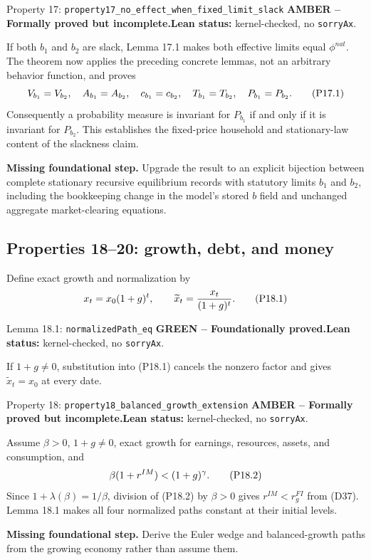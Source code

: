 \documentclass[11pt]{article}
\newcommand{\leanname}[1]{\nolinkurl{#1}}
\newcommand{\eqP}[1]{\refstepcounter{equation}\tag{P#1}}
\newcommand{\formalcheck}{\textbf{Lean status:} kernel-checked, no \texttt{sorryAx}.}
\newcommand{\missing}[1]{\par\smallskip\textbf{Missing foundational step.} #1}
\newcommand{\greenstatus}{\textcolor{proved}{\textbf{GREEN -- Foundationally proved.}}}
\newcommand{\amberstatus}{\textcolor{conditional}{\textbf{AMBER -- Formally proved but incomplete.}}}
\begin{document}
\begin{amberbox}{Property 17: \leanname{property17_no_effect_when_fixed_limit_slack}}
\amberstatus\quad\formalcheck

If both \(b_1\) and \(b_2\) are slack, Lemma 17.1 makes both effective limits
equal \(\phi^{nat}\).  The theorem now applies the preceding concrete lemmas,
not an arbitrary behavior function, and proves
\begin{equation}
 V_{b_1}=V_{b_2},\quad A_{b_1}=A_{b_2},\quad c_{b_1}=c_{b_2},\quad
 T_{b_1}=T_{b_2},\quad P_{b_1}=P_{b_2}. \eqP{17.1}\label{P17.1}
\end{equation}
Consequently a probability measure is invariant for $P_{b_1}$ if and only if
it is invariant for $P_{b_2}$.  This establishes the fixed-price household
and stationary-law content of the slackness claim.

\missing{Upgrade the result to an explicit bijection between complete
stationary recursive equilibrium records with statutory limits $b_1$ and
$b_2$, including the bookkeeping change in the model's stored $b$ field and
unchanged aggregate market-clearing equations.}
\end{amberbox}

\subsection{Properties 18--20: growth, debt, and money}

Define exact growth and normalization by
\begin{equation}
 x_t=x_0(1+g)^t,\qquad \widetilde x_t=\frac{x_t}{(1+g)^t}. \eqP{18.1}\label{P18.1}
\end{equation}

\begin{greenbox}{Lemma 18.1: \leanname{normalizedPath_eq}}
\greenstatus\quad\formalcheck

If \(1+g\ne0\), substitution into (P18.1) cancels the nonzero factor and
gives \(\widetilde x_t=x_0\) at every date.
\end{greenbox}

\begin{amberbox}{Property 18: \leanname{property18_balanced_growth_extension}}
\amberstatus\quad\formalcheck

Assume \(\beta>0\), \(1+g\ne0\), exact growth for earnings, resources, assets,
and consumption, and
\begin{equation}
 \beta(1+r^{IM})<(1+g)^\gamma. \eqP{18.2}\label{P18.2}
\end{equation}
Since \(1+\lambda(\beta)=1/\beta\), division of (P18.2) by \(\beta>0\) gives
\(r^{IM}<r_g^{FI}\) from (D37).  Lemma 18.1 makes all four normalized paths
constant at their initial levels.

\missing{Derive the Euler wedge and balanced-growth paths from the growing
economy rather than assume them.}
\end{amberbox}
\end{document}
